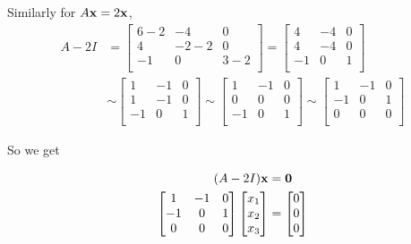 \documentclass[12pt]{article}
\renewcommand{\vec}[1]{
  {\bf #1}
}
\begin{document}
{    Similarly for $A\vec{x} = 2\vec{x}$,
    \begin{align*}
      A - 2I &= \begin{bmatrix}
        6 - 2 & -4 & 0 \\
        4 & -2 - 2 & 0 \\
       -1 &  0 & 3 - 2 \\
      \end{bmatrix} 
      =
      \begin{bmatrix}
        4 & -4 & 0 \\
        4 & -4 & 0 \\
       -1 &  0 & 1 \\
      \end{bmatrix} \\
      &\sim
      \begin{bmatrix}
        1 & -1 & 0 \\
        1 & -1 & 0 \\
       -1 &  0 & 1 \\
      \end{bmatrix}
      \sim
      \begin{bmatrix}
        1 & -1 & 0 \\
        0 &  0 & 0 \\
       -1 &  0 & 1 \\
      \end{bmatrix}
      \sim
      \begin{bmatrix}
        1 & -1 & 0 \\
       -1 &  0 & 1 \\
        0 &  0 & 0 \\
      \end{bmatrix}
    \end{align*}

    So we get

    \begin{align*}
      (A - 2I)\vec{x} &= \vec{0} \\
      \begin{bmatrix}
        1 & -1 & 0 \\
       -1 &  0 & 1 \\
        0 &  0 & 0 \\
      \end{bmatrix}
      \begin{bmatrix}
        x_1 \\
        x_2 \\
        x_3 \\
      \end{bmatrix}
      &=
      \begin{bmatrix}
        0 \\
        0 \\
        0 \\
      \end{bmatrix}
    \end{align*}

}
\end{document}
